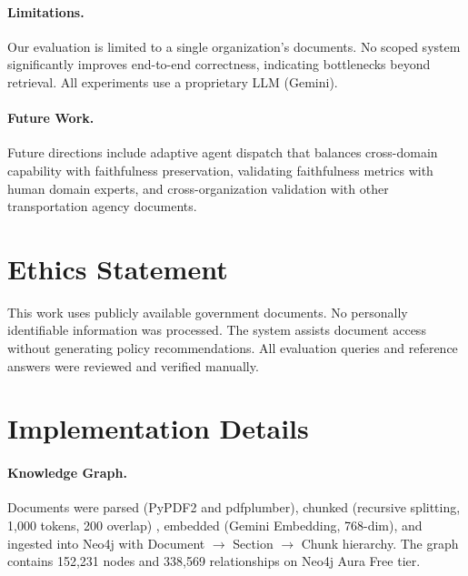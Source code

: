 \documentclass{article}
\begin{document}
\paragraph{Limitations.} Our evaluation is limited to a single organization's documents. No scoped system significantly improves end-to-end correctness, indicating bottlenecks beyond retrieval. All experiments use a proprietary LLM (Gemini).

\paragraph{Future Work.} Future directions include adaptive agent dispatch that balances cross-domain capability with faithfulness preservation, validating faithfulness metrics with human domain experts, and cross-organization validation with other transportation agency documents.


\section*{Ethics Statement}
This work uses publicly available government documents. No personally identifiable information was processed. The system assists document access without generating policy recommendations. All evaluation queries and reference answers were reviewed and verified manually.




\appendix







\section{Implementation Details}
\label{app:implementation}



\paragraph{Knowledge Graph.} Documents were parsed (PyPDF2 and pdfplumber), chunked (recursive splitting, 1,000 tokens, 200 overlap) \cite{langchain2024recursive}, embedded (Gemini Embedding, 768-dim), and ingested into Neo4j with Document $\rightarrow$ Section $\rightarrow$ Chunk hierarchy. The graph contains 152,231 nodes and 338,569 relationships on Neo4j Aura Free tier.
\end{document}
